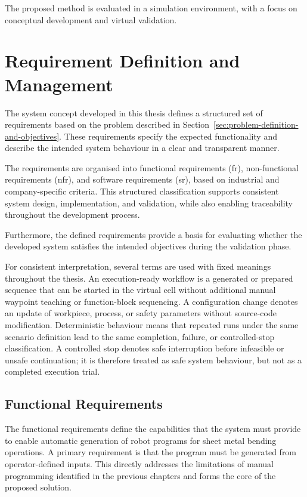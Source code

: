 The proposed method is evaluated in a simulation environment, with a focus on conceptual development and virtual validation.

\section{Requirement Definition and Management}
\label{sec:requirement-definition-and-management}

The system concept developed in this thesis defines a structured set of requirements based on the problem described in Section~\ref{sec:problem-definition-and-objectives}. These requirements specify the expected functionality and describe the intended system behaviour in a clear and transparent manner.

The requirements are organised into functional requirements (\acs{fr}), non-functional requirements (\acs{nfr}), and software requirements (\acs{sr}), based on industrial and company-specific criteria. This structured classification supports consistent system design, implementation, and validation, while also enabling traceability throughout the development process.

Furthermore, the defined requirements provide a basis for evaluating whether the developed system satisfies the intended objectives during the validation phase.

For consistent interpretation, several terms are used with fixed meanings throughout the thesis. An execution-ready workflow is a generated or prepared sequence that can be started in the virtual cell without additional manual waypoint teaching or function-block sequencing. A configuration change denotes an update of workpiece, process, or safety parameters without source-code modification. Deterministic behaviour means that repeated runs under the same scenario definition lead to the same completion, failure, or controlled-stop classification. A controlled stop denotes safe interruption before infeasible or unsafe continuation; it is therefore treated as safe system behaviour, but not as a completed execution trial.

\subsection{Functional Requirements}
\label{sec:functional-requirements}

The functional requirements define the capabilities that the system must provide to enable automatic generation of robot programs for sheet metal bending operations. A primary requirement is that the program must be generated from operator-defined inputs. This directly addresses the limitations of manual programming identified in the previous chapters and forms the core of the proposed solution.

